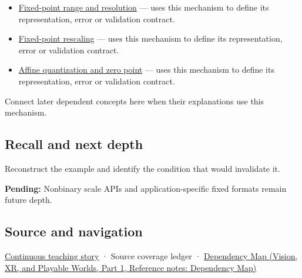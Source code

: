 \begin{itemize}
\tightlist
\item
  \hyperref[appendix-ceb4c4a9b5a1]{Fixed-point range and resolution} --- uses this mechanism to define its representation, error or validation contract.
\item
  \hyperref[appendix-3333db47830f]{Fixed-point rescaling} --- uses this mechanism to define its representation, error or validation contract.
\item
  \hyperref[appendix-d5da3eaabaef]{Affine quantization and zero point} --- uses this mechanism to define its representation, error or validation contract.
\end{itemize}

Connect later dependent concepts here when their explanations use this mechanism.

\subsection{Recall and next depth}\label{appendix-1d0dbe8924cc-recall-and-next-depth}

\hypertarget{appendix-1d0dbe8924cc-recall-and-next-depth}{}

Reconstruct the example and identify the condition that would invalidate it.

\textbf{Pending:} Nonbinary scale APIs and application-specific fixed formats remain future depth.

\subsection{Source and navigation}\label{appendix-1d0dbe8924cc-source-and-navigation}

\hypertarget{appendix-1d0dbe8924cc-source-and-navigation}{}

\hyperref[01-foundations-i-ch001-choosing-what-information-to-keep]{Continuous teaching story} · {Source coverage ledger} · \href{../07-Vision-XR-and-Playable-Worlds-P01/main.pdf\#nameddest=appendix-4ad47bdd269a}{Dependency Map (Vision, XR, and Playable Worlds, Part 1, Reference notes: Dependency Map)}
